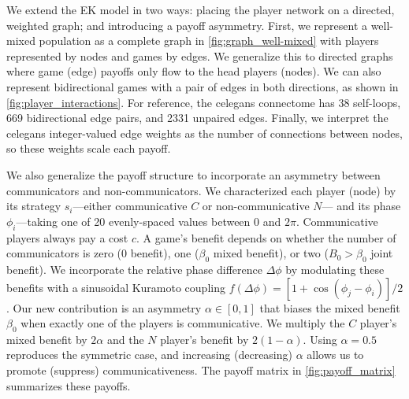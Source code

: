 \documentclass[pdflatex,lineno,referee,sn-nature]{sn-jnl}
\begin{document}
We extend the EK model in two ways:
placing the player network on a directed, weighted graph;
and introducing a payoff asymmetry.
First, we represent a well-mixed population
as a complete graph in \cref{fig:graph_well-mixed}
with players represented by nodes and games by edges.
We generalize this to directed graphs
where game (edge) payoffs only flow to the head players (nodes).
We can also represent bidirectional games with
a pair of edges in both directions,
as shown in \cref{fig:player_interactions}.
For reference, the \gls{celegans} connectome
has \num{38} self-loops, \num{669} bidirectional edge pairs,
and \num{2331} unpaired edges.
Finally, we interpret the \gls{celegans} integer-valued
edge weights as the number of connections between nodes,
so these weights scale each payoff.

We also generalize the payoff structure to incorporate
an asymmetry between communicators and non-communicators.
We characterized each player (node) by its
strategy $s_i$---either communicative $C$ or non-communicative $N$---
and its phase $\phi_i$---taking one of \num{20} evenly-spaced values
between $0$ and $2 \pi$.
Communicative players always pay a cost $c$.
A game's benefit depends on whether the number of communicators is
zero (\num{0} benefit), one ($\beta_0$ mixed benefit),
or two ($B_0 > \beta_0$ joint benefit).
We incorporate the relative phase difference $\Delta \phi$
by modulating these benefits with a sinusoidal Kuramoto coupling
$f(\Delta \phi) = [1+\cos(\phi_j - \phi_i)]/2$.
Our new contribution is an asymmetry $\alpha \in [0,1]$
that biases the mixed benefit $\beta_0$ when exactly one of the players is communicative.
We multiply the $C$ player's mixed benefit by $2\alpha$
and the $N$ player's benefit by $2(1 - \alpha)$.
Using $\alpha = 0.5$ reproduces the symmetric case,
and increasing (decreasing) $\alpha$ allows us
to promote (suppress) communicativeness.
The payoff matrix in \cref{fig:payoff_matrix} summarizes these payoffs.
\end{document}
